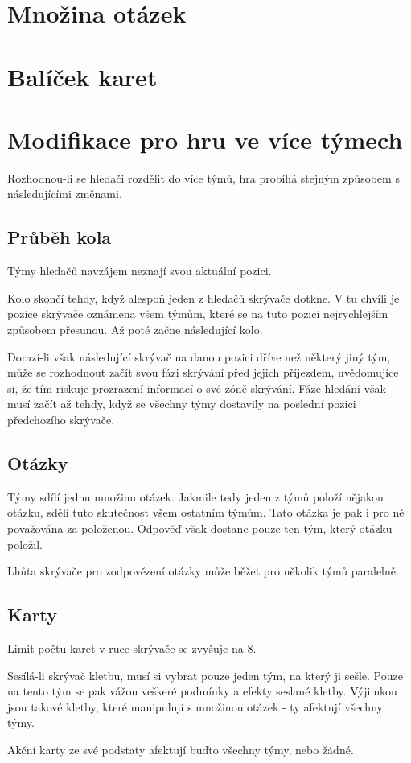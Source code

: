 \documentclass{book}
\begin{document}
\section{Množina otázek}\label{otázky}



\section{Balíček karet}\label{karty}



\section{Modifikace pro hru ve více týmech}\label{týmy}

Rozhodnou-li se hledači rozdělit do více týmů, hra probíhá stejným způsobem s následujícími změnami.

\subsection{Průběh kola}

Týmy hledačů navzájem neznají svou aktuální pozici.

Kolo skončí tehdy, když alespoň jeden z hledačů skrývače dotkne. V tu chvíli je pozice skrývače oznámena všem týmům, které se na tuto pozici nejrychlejším způsobem přesunou. Až poté začne následující kolo.

Dorazí-li však následující skrývač na danou pozici dříve než některý jiný tým, může se rozhodnout začít svou fázi skrývání před jejich příjezdem, uvědomujíce si, že tím riskuje prozrazení informací o své zóně skrývání. Fáze hledání však musí začít až tehdy, když se všechny týmy dostavily na poslední pozici předchozího skrývače.

\subsection{Otázky}

Týmy sdílí jednu množinu otázek. Jakmile tedy jeden z týmů položí nějakou otázku, sdělí tuto skutečnost všem ostatním týmům. Tato otázka je pak i pro ně považována za položenou. Odpověď však dostane pouze ten tým, který otázku položil.

Lhůta skrývače pro zodpovězení otázky může běžet pro několik týmů paralelně.

\subsection{Karty}

Limit počtu karet v ruce skrývače se zvyšuje na 8.

Sesílá-li skrývač kletbu, musí si vybrat pouze jeden tým, na který ji sešle. Pouze na tento tým se pak vážou veškeré podmínky a efekty seslané kletby. Výjimkou jsou takové kletby, které manipulují s množinou otázek - ty afektují všechny týmy.

Akční karty ze své podstaty afektují buďto všechny týmy, nebo žádné.
\end{document}
